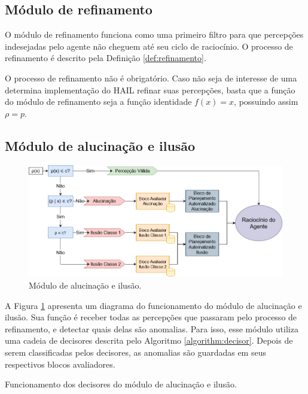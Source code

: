 \subsection{Módulo de refinamento}

\label{refinamento}

O módulo de refinamento funciona como uma primeiro filtro para que percepções indesejadas pelo agente não cheguem até seu ciclo de raciocínio. O processo de refinamento é descrito pela Definição \ref{def:refinamento}.

O processo de refinamento não é obrigatório. Caso não seja de interesse de uma determina implementação do HAIL refinar suas percepções, basta que a função do módulo de refinamento seja a função identidade $f(x) = x$, possuindo assim $\rho = p$.

\subsection{Módulo de alucinação e ilusão}

\begin{figure}[h]
    \centering
    \includegraphics[width=1\textwidth]{images/diagrama-modelo.png}
    \caption{Módulo de alucinação e ilusão.}
    \label{fig:model}
\end{figure}
 
 A Figura \ref{fig:model} apresenta um diagrama do funcionamento do módulo de alucinação e ilusão. Sua função é receber todas as percepções que passaram pelo processo de refinamento, e detectar quais delas são anomalias. Para isso, esse módulo utiliza uma cadeia de decisores descrita pelo Algoritmo \ref{algorithm:decisor}. Depois de serem classificadas pelos decisores, as anomalias são guardadas em seus respectivos blocos avaliadores.

\begin{algorithm}[H]
 \caption{Funcionamento dos decisores do módulo de alucinação e ilusão.}
\end{algorithm}


